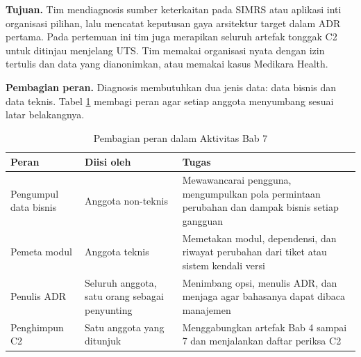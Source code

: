 \textbf{Tujuan.} Tim mendiagnosis sumber keterkaitan pada SIMRS atau aplikasi inti organisasi
pilihan, lalu mencatat keputusan gaya arsitektur target dalam ADR pertama. Pada pertemuan ini tim
juga merapikan seluruh artefak tonggak C2 untuk ditinjau menjelang UTS. Tim memakai organisasi
nyata dengan izin tertulis dan data yang dianonimkan, atau memakai kasus Medikara Health.

\textbf{Pembagian peran.} Diagnosis membutuhkan dua jenis data: data bisnis dan data teknis. Tabel
\ref{tab:ch07-peran} membagi peran agar setiap anggota menyumbang sesuai latar belakangnya.

\begin{table}[!htb]
  \centering
  \caption{Pembagian peran dalam Aktivitas Bab 7}
  \label{tab:ch07-peran}
  \footnotesize
  \begin{tabularx}{\textwidth}{>{\raggedright\arraybackslash}p{2.6cm} >{\raggedright\arraybackslash}p{3.0cm} >{\raggedright\arraybackslash}X}
    \hline
    \textbf{Peran} & \textbf{Diisi oleh} & \textbf{Tugas} \\ \hline
    Pengumpul data bisnis & Anggota non-teknis & Mewawancarai pengguna, mengumpulkan pola
      permintaan perubahan dan dampak bisnis setiap gangguan \\ \hline
    Pemeta modul & Anggota teknis & Memetakan modul, dependensi, dan riwayat perubahan dari tiket
      atau sistem kendali versi \\ \hline
    Penulis ADR & Seluruh anggota, satu orang sebagai penyunting & Menimbang opsi, menulis ADR,
      dan menjaga agar bahasanya dapat dibaca manajemen \\ \hline
    Penghimpun C2 & Satu anggota yang ditunjuk & Menggabungkan artefak Bab 4 sampai 7 dan
      menjalankan daftar periksa C2 \\ \hline
  \end{tabularx}
\end{table}

